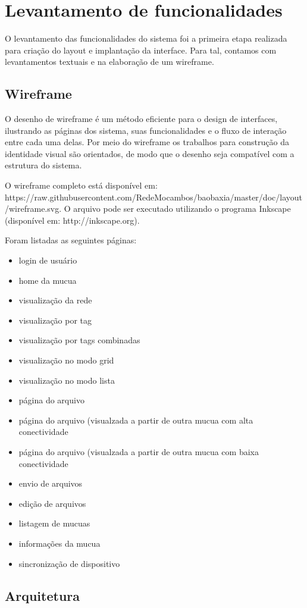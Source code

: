 \section{Levantamento de funcionalidades}
O levantamento das funcionalidades do sistema foi a primeira etapa
realizada para criação do layout e implantação da interface. Para
tal, contamos com levantamentos textuais e na elaboração de um
wireframe.

\subsection{Wireframe}
O desenho de wireframe é um método eficiente para o design de
interfaces, ilustrando as páginas dos sistema, suas funcionalidades
e o fluxo de interação entre cada uma delas. Por meio do wireframe
os trabalhos para construção da identidade visual são orientados,
de modo que o desenho seja compatível com a estrutura do sistema.

O wireframe completo está disponível em: https://raw.githubusercontent.com/RedeMocambos/baobaxia/master/doc/layout/wireframe.svg.
O arquivo pode ser executado utilizando o programa Inkscape (disponível
em: http://inkscape.org).

Foram listadas as seguintes páginas:
\begin{itemize}
\item login de usuário
\item home da mucua
\item visualização da rede
\item visualização por tag
\item visualização por tags combinadas
\item visualização no modo grid
\item visualização no modo lista
\item página do arquivo
\item página do arquivo (visualzada a partir de outra mucua com alta
  conectividade
\item página do arquivo (visualzada a partir de outra mucua com baixa
  conectividade
\item envio de arquivos
\item edição de arquivos
\item listagem de mucuas
\item informações da mucua
\item sincronização de dispositivo
\end{itemize}

\subsection{Arquitetura}

